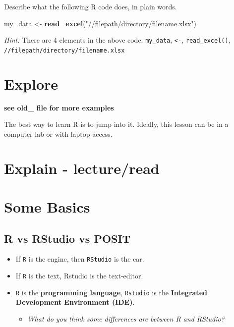 \documentclass[
]{book}
\newenvironment{Shaded}{\begin{snugshade}}{\end{snugshade}}
\newcommand{\FunctionTok}[1]{\textcolor[rgb]{0.13,0.29,0.53}{\textbf{#1}}}
\newcommand{\NormalTok}[1]{#1}
\newcommand{\OtherTok}[1]{\textcolor[rgb]{0.56,0.35,0.01}{#1}}
\newcommand{\StringTok}[1]{\textcolor[rgb]{0.31,0.60,0.02}{#1}}
\providecommand{\tightlist}{%
  \setlength{\itemsep}{0pt}\setlength{\parskip}{0pt}}
\begin{document}
Describe what the following R code does, in plain words.

\begin{Shaded}
\begin{Highlighting}[]
\NormalTok{my\_data }\OtherTok{\textless{}{-}} \FunctionTok{read\_excel}\NormalTok{(}\StringTok{"//filepath/directory/filename.xlsx"}\NormalTok{)}
\end{Highlighting}
\end{Shaded}

\emph{Hint:} There are 4 elements in the above code:
\texttt{my\_data},
\texttt{\textless{}-},
\texttt{read\_excel()},
\texttt{//filepath/directory/filename.xlsx}

\hypertarget{explore-6}{%
\section{Explore}\label{explore-6}}

\textbf{see old\_ file for more examples}

The best way to learn R is to jump into it. Ideally, this lesson can be in a
computer lab or with laptop access.

\hypertarget{explain---lectureread-4}{%
\section{Explain - lecture/read}\label{explain---lectureread-4}}

\hypertarget{some-basics}{%
\section{Some Basics}\label{some-basics}}

\hypertarget{r-vs-rstudio-vs-posit}{%
\subsection{R vs RStudio vs POSIT}\label{r-vs-rstudio-vs-posit}}

\begin{itemize}
\item
  If \texttt{R} is the engine, then \texttt{RStudio} is the car.
\item
  If \texttt{R} is the text, Rstudio is the text-editor.
\item
  \texttt{R} is the \textbf{programming language}, \texttt{Rstudio} is the \textbf{Integrated Development Environment (IDE)}.

  \begin{itemize}
  \tightlist
  \item
    \emph{What do you think some differences are between R and RStudio?}
  \end{itemize}
\end{itemize}
\end{document}
